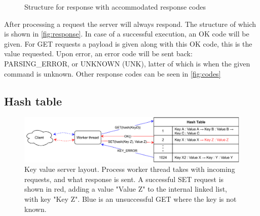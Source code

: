 \begin{figure}
    \centering
    \caption{Structure for response with accommodated response codes}
\end{figure}

After processing a request the server will always respond.
The structure of which is shown in \ref{fig:response}.
In case of a successful execution, an OK code will be given.
For GET requests a payload is given along with this OK code, this is the value requested.
Upon error, an error code will be sent back: PARSING\_ERROR, or UNKNOWN (UNK), latter of which is when the given command is unknown.
Other response codes can be seen in \ref{fig:codes}


\subsection{Hash table}

\begin{figure}
    \centering
    \includegraphics[width=\columnwidth]{figures/PDF/Client_to_hash_table}
    \caption[Key value server layout]{Key value server layout. Process worker thread takes with incoming requests, and what response is sent. A successful SET request is shown in red, adding a value "Value Z" to the internal linked list, with key "Key Z". Blue is an unsuccessful GET where the key is not known.}
    \label{fig:hash_table}
\end{figure}

